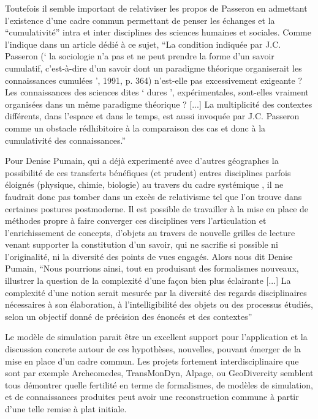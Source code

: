 Toutefois il semble important de relativiser les propos de Passeron en admettant l'existence d'une cadre commun permettant de penser les échanges et la \enquote{cumulativité}  intra et inter disciplines des sciences humaines et sociales. Comme l'indique \textcite{Pumain2005} dans un article dédié à ce sujet, \enquote{La condition indiquée par J.C. Passeron (\enquote{ la sociologie n’a pas et ne peut prendre la forme d’un savoir cumulatif, c’est-à-dire d’un savoir dont un paradigme théorique organiserait les connaissances cumulées }, 1991, p. 364) n’est-elle pas excessivement exigeante ? Les connaissances des sciences dites \enquote{ dures }, expérimentales, sont-elles vraiment organisées dans un même paradigme théorique ? [...] La multiplicité des contextes différents, dans l’espace et dans le temps, est aussi invoquée par J.C. Passeron comme un obstacle rédhibitoire à la comparaison des cas et donc à la cumulativité des connaissances.} 

Pour Denise Pumain, qui a déjà experimenté avec d'autres géographes la possibilité de ces transferts bénéfiques (et prudent) entres disciplines parfois éloignés (physique, chimie, biologie) au travers du cadre systémique \autocites{Pumain1989,Sanders1992, Dastes1998}, il ne faudrait donc pas tomber dans un excès de relativisme tel que l'on trouve dans certaines postures postmoderne. Il est possible de travailler à la mise en place de méthodes  propre à faire converger ces disciplines vers l'articulation et l'enrichissement de concepts, d'objets au travers de nouvelle grilles de lecture venant supporter la constitution d'un savoir, qui ne sacrifie si possible ni l'originalité, ni la diversité des points de vues engagés. Alors nous dit Denise Pumain, \enquote{Nous pourrions ainsi, tout en produisant des formalismes nouveaux, illustrer la question de la complexité d’une façon bien plus éclairante [...] La complexité d’une notion serait mesurée par la diversité des regards disciplinaires nécessaires à son élaboration, à l’intelligibilité des objets ou des processus étudiés, selon un objectif donné de précision des énoncés et des contextes}

Le modèle de simulation parait être un excellent support pour l'application et la discussion concrete autour de ces hypothèses, nouvelles, pouvant émerger de la mise en place d'un cadre commun. Les projets fortement interdisciplinaire que sont par exemple Archeomedes, TransMonDyn, Alpage, ou GeoDivercity \autocite{Chapron2014} semblent tous démontrer quelle fertilité en terme de formalismes, de modèles de simulation, et de connaissances produites peut avoir une reconstruction commune à partir d'une telle remise à plat initiale.

